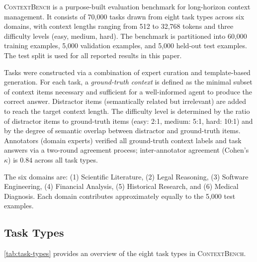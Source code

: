 \documentclass[review,12pt]{elsarticle}
\newcommand{\contextbench}{\textsc{ContextBench}}
\begin{document}
\contextbench{} is a purpose-built evaluation benchmark for long-horizon context
management.  It consists of 70,000 tasks drawn from eight task types across six
domains, with context lengths ranging from 512 to 32,768 tokens and three
difficulty levels (easy, medium, hard).  The benchmark is partitioned into
60,000 training examples, 5,000 validation examples, and 5,000 held-out test
examples.  The test split is used for all reported results in this paper.

Tasks were constructed via a combination of expert curation and template-based
generation.  For each task, a \emph{ground-truth context} is defined as the
minimal subset of context items necessary and sufficient for a well-informed
agent to produce the correct answer.  Distractor items (semantically related
but irrelevant) are added to reach the target context length.  The difficulty
level is determined by the ratio of distractor items to ground-truth items
(easy: 2:1, medium: 5:1, hard: 10:1) and by the degree of semantic overlap
between distractor and ground-truth items.  Annotators (domain experts)
verified all ground-truth context labels and task answers via a two-round
agreement process; inter-annotator agreement (Cohen's $\kappa$) is $0.84$
across all task types.

The six domains are: (1) Scientific Literature, (2) Legal Reasoning,
(3) Software Engineering, (4) Financial Analysis, (5) Historical Research,
and (6) Medical Diagnosis.  Each domain contributes approximately equally to
the 5,000 test examples.

\subsection{Task Types}
\label{subsec:task-types}

\cref{tab:task-types} provides an overview of the eight task types in
\contextbench{}.
\end{document}
